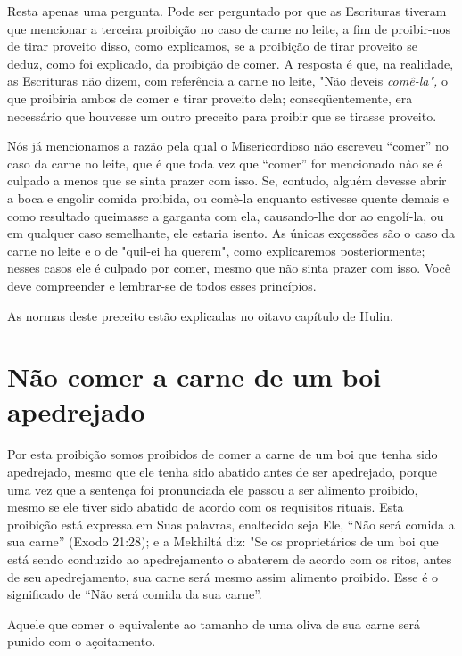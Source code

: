 Resta apenas uma pergunta. Pode ser perguntado por que as Escritu­ras
tiveram que mencionar a terceira proibição no caso de carne no leite, a
fim de proibir-nos de tirar proveito disso, como explicamos, se a
proibição de tirar proveito se deduz, como foi explicado, da proibição
de comer. A resposta é que, na realidade, as Escrituras não dizem, com
referência a carne no leite, "Não deveis \emph{comê-la",} o que
proibiria ambos de comer e tirar proveito dela; conse­qüentemente, era
necessário que houvesse um outro preceito para proibir que se tirasse
proveito.

Nós já mencionamos a razão pela qual o Misericordioso não escre­veu
``comer'' no caso da carne no leite, que é que toda vez que ``comer'' for
mencionado nào se é culpado a menos que se sinta prazer com isso. Se,
contu­do, alguém devesse abrir a boca e engolir comida proibida, ou
comè-la enquanto estivesse quente demais e como resultado queimasse a
garganta com ela, causando-lhe dor ao engolí-la, ou em qualquer caso
semelhante, ele estaria isento. As únicas exçessões são o caso da carne
no leite e o de "quil-ei ha querem", como explicaremos posteriormente;
nesses casos ele é culpado por comer, mes­mo que não sinta prazer com
isso. Você deve compreender e lembrar-se de to­dos esses princípios.


As normas deste preceito estão explicadas no oitavo capítulo de Hulin.


\section{Não comer a carne de um boi apedrejado}

Por esta proibição somos proibidos de comer a carne de um boi que tenha
sido apedrejado, mesmo que ele tenha sido abatido antes de ser
apedre­jado, porque uma vez que a sentença foi pronunciada ele passou a
ser alimento proibido, mesmo se ele tiver sido abatido de acordo com os
requisitos rituais. Esta proibição está expressa em Suas palavras,
enaltecido seja Ele, ``Não será comida a sua carne'' (Exodo 21:28); e a
Mekhiltá diz: "Se os proprietários de um boi que está sendo conduzido ao
apedrejamento o abaterem de acordo com os ritos, antes de seu
apedrejamento, sua carne será mesmo assim alimento proi­bido. Esse é o
significado de ``Não será comida da sua carne''.

Aquele que comer o equivalente ao tamanho de uma oliva de sua carne será
punido com o açoitamento.


